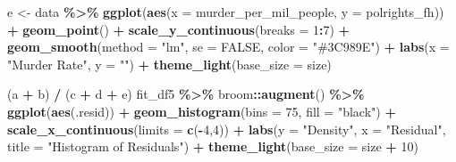 \documentclass[
  english,
  man,floatsintext]{apa6}
\newenvironment{Shaded}{\begin{snugshade}}{\end{snugshade}}
\newcommand{\DataTypeTok}[1]{\textcolor[rgb]{0.13,0.29,0.53}{#1}}
\newcommand{\DecValTok}[1]{\textcolor[rgb]{0.00,0.00,0.81}{#1}}
\newcommand{\KeywordTok}[1]{\textcolor[rgb]{0.13,0.29,0.53}{\textbf{#1}}}
\newcommand{\NormalTok}[1]{#1}
\newcommand{\OperatorTok}[1]{\textcolor[rgb]{0.81,0.36,0.00}{\textbf{#1}}}
\newcommand{\OtherTok}[1]{\textcolor[rgb]{0.56,0.35,0.01}{#1}}
\newcommand{\StringTok}[1]{\textcolor[rgb]{0.31,0.60,0.02}{#1}}
\begin{document}
\begin{Shaded}
\begin{Highlighting}[]
\NormalTok{e \textless{}{-}}\StringTok{ }\NormalTok{data }\OperatorTok{\%\textgreater{}\%}\StringTok{ }
\StringTok{  }\KeywordTok{ggplot}\NormalTok{(}\KeywordTok{aes}\NormalTok{(}\DataTypeTok{x =}\NormalTok{ murder\_per\_mil\_people, }\DataTypeTok{y =}\NormalTok{ polrights\_fh)) }\OperatorTok{+}\StringTok{ }
\StringTok{  }\KeywordTok{geom\_point}\NormalTok{() }\OperatorTok{+}\StringTok{ }
\StringTok{  }\KeywordTok{scale\_y\_continuous}\NormalTok{(}\DataTypeTok{breaks =} \DecValTok{1}\OperatorTok{:}\DecValTok{7}\NormalTok{) }\OperatorTok{+}\StringTok{ }
\StringTok{  }\KeywordTok{geom\_smooth}\NormalTok{(}\DataTypeTok{method =} \StringTok{"lm"}\NormalTok{, }\DataTypeTok{se =} \OtherTok{FALSE}\NormalTok{, }\DataTypeTok{color =} \StringTok{"\#3C989E"}\NormalTok{) }\OperatorTok{+}\StringTok{ }
\StringTok{  }\KeywordTok{labs}\NormalTok{(}\DataTypeTok{x =} \StringTok{"Murder Rate"}\NormalTok{, }\DataTypeTok{y =} \StringTok{""}\NormalTok{) }\OperatorTok{+}\StringTok{ }\KeywordTok{theme\_light}\NormalTok{(}\DataTypeTok{base\_size =}\NormalTok{ size)}

\NormalTok{(a }\OperatorTok{+}\StringTok{ }\NormalTok{b) }\OperatorTok{/}\StringTok{ }\NormalTok{(c }\OperatorTok{+}\StringTok{ }\NormalTok{d }\OperatorTok{+}\StringTok{ }\NormalTok{e) }
\NormalTok{fit\_df5 }\OperatorTok{\%\textgreater{}\%}\StringTok{ }
\StringTok{  }\NormalTok{broom}\OperatorTok{::}\KeywordTok{augment}\NormalTok{() }\OperatorTok{\%\textgreater{}\%}\StringTok{ }
\StringTok{  }\KeywordTok{ggplot}\NormalTok{(}\KeywordTok{aes}\NormalTok{(.resid)) }\OperatorTok{+}\StringTok{ }
\StringTok{  }\KeywordTok{geom\_histogram}\NormalTok{(}\DataTypeTok{bins =} \DecValTok{75}\NormalTok{, }\DataTypeTok{fill =} \StringTok{"black"}\NormalTok{) }\OperatorTok{+}
\StringTok{  }\KeywordTok{scale\_x\_continuous}\NormalTok{(}\DataTypeTok{limits =} \KeywordTok{c}\NormalTok{(}\OperatorTok{{-}}\DecValTok{4}\NormalTok{,}\DecValTok{4}\NormalTok{)) }\OperatorTok{+}\StringTok{ }
\StringTok{  }\KeywordTok{labs}\NormalTok{(}\DataTypeTok{y =} \StringTok{"Density"}\NormalTok{, }\DataTypeTok{x =} \StringTok{"Residual"}\NormalTok{, }\DataTypeTok{title =} \StringTok{"Histogram of Residuals"}\NormalTok{) }\OperatorTok{+}\StringTok{ }
\StringTok{  }\KeywordTok{theme\_light}\NormalTok{(}\DataTypeTok{base\_size =}\NormalTok{ size }\OperatorTok{+}\StringTok{ }\DecValTok{10}\NormalTok{)}



\end{Highlighting}
\end{Shaded}
\end{document}
